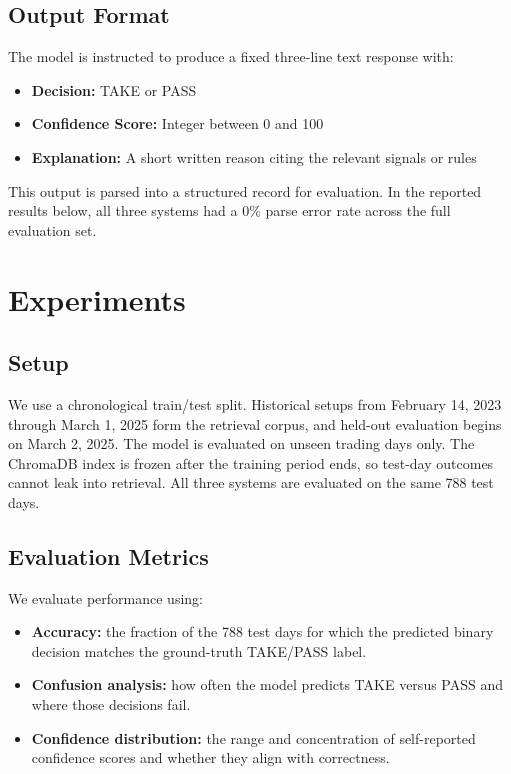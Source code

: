 \documentclass{article}
\begin{document}
\subsection{Output Format}

The model is instructed to produce a fixed three-line text response with:
\begin{itemize}
    \item \textbf{Decision:} TAKE or PASS
    \item \textbf{Confidence Score:} Integer between 0 and 100
    \item \textbf{Explanation:} A short written reason citing the relevant signals or rules
\end{itemize}

This output is parsed into a structured record for evaluation. In the reported results below, all three systems had a 0\% parse error rate across the full evaluation set.

\section{Experiments}

\subsection{Setup}

We use a chronological train/test split. Historical setups from February 14, 2023 through March 1, 2025 form the retrieval corpus, and held-out evaluation begins on March 2, 2025. The model is evaluated on unseen trading days only. The ChromaDB index is frozen after the training period ends, so test-day outcomes cannot leak into retrieval. All three systems are evaluated on the same 788 test days.

\subsection{Evaluation Metrics}

We evaluate performance using:
\begin{itemize}
    \item \textbf{Accuracy:} the fraction of the 788 test days for which the predicted binary decision matches the ground-truth TAKE/PASS label.
    \item \textbf{Confusion analysis:} how often the model predicts TAKE versus PASS and where those decisions fail.
    \item \textbf{Confidence distribution:} the range and concentration of self-reported confidence scores and whether they align with correctness.
\end{itemize}
\end{document}
